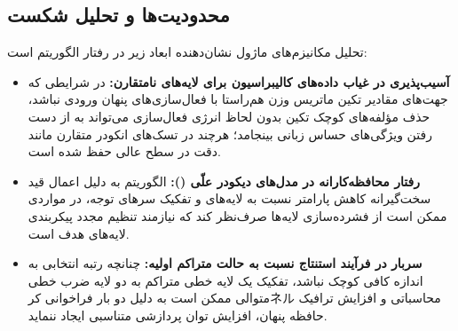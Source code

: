 \subsection{محدودیت‌ها و تحلیل شکست}
تحلیل مکانیزم‌های ماژول  نشان‌دهنده ابعاد زیر در رفتار الگوریتم است:
\begin{itemize}
    \item \textbf{آسیب‌پذیری در غیاب داده‌های کالیبراسیون برای لایه‌های نامتقارن:} در شرایطی که جهت‌های مقادیر تکین ماتریس وزن هم‌راستا با فعال‌سازی‌های پنهان ورودی نباشد، حذف مؤلفه‌های کوچک تکین بدون لحاظ انرژی فعال‌سازی می‌تواند به از دست رفتن ویژگی‌های حساس زبانی بینجامد؛ هرچند در تسک‌های انکودر متقارن مانند  دقت در سطح عالی حفظ شده است.
    \item \textbf{رفتار محافظه‌کارانه در مدل‌های دیکودر علّی ():} الگوریتم به دلیل اعمال قید سخت‌گیرانه کاهش پارامتر نسبت به لایه‌های  و تفکیک سرهای توجه، در مواردی ممکن است از فشرده‌سازی لایه‌ها صرف‌نظر کند که نیازمند تنظیم مجدد پیکربندی لایه‌های هدف است.
    \item \textbf{سربار در فرآیند استنتاج نسبت به حالت متراکم اولیه:} چنانچه رتبه انتخابی به اندازه کافی کوچک نباشد، تفکیک یک لایه خطی متراکم به دو لایه ضرب خطی متوالی ممکن است به دلیل دو بار فراخوانی کرネル محاسباتی و افزایش ترافیک حافظه پنهان، افزایش توان پردازشی متناسبی ایجاد ننماید.
\end{itemize}
